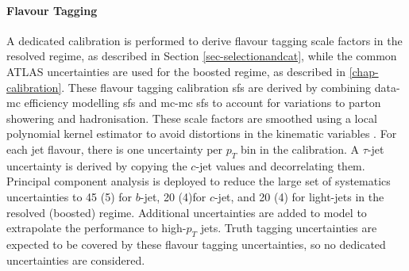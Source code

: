 \paragraph{Flavour Tagging} A dedicated calibration is performed to derive flavour tagging scale factors in the resolved regime, as described in Section \ref{sec-selectionandcat}, while the common ATLAS uncertainties are used for the boosted regime, as described in \ref{chap-calibration}. These flavour tagging calibration \glspl{sf} are derived by combining data-\gls{mc} efficiency modelling \glspl{sf} and \gls{mc}-\gls{mc} \glspl{sf} to account for variations to parton showering and hadronisation. These scale factors are smoothed using a local polynomial kernel estimator to avoid distortions in the kinematic variables \cite{ATL-PHYS-PUB-2020-004}. For each jet flavour, there is one uncertainty per $p_T$ bin in the calibration. A $\tau$-jet uncertainty is derived by copying the $c$-jet values and decorrelating them. Principal component analysis is deployed to reduce the large set of systematics uncertainties to 45 (5) for $b$-jet, 20 (4)for $c$-jet, and 20 (4) for light-jets in the resolved (boosted) regime. Additional uncertainties are added to model to extrapolate the performance to high-$p_T$ jets. Truth tagging uncertainties are expected to be covered by these flavour tagging uncertainties, so no dedicated uncertainties are considered.

